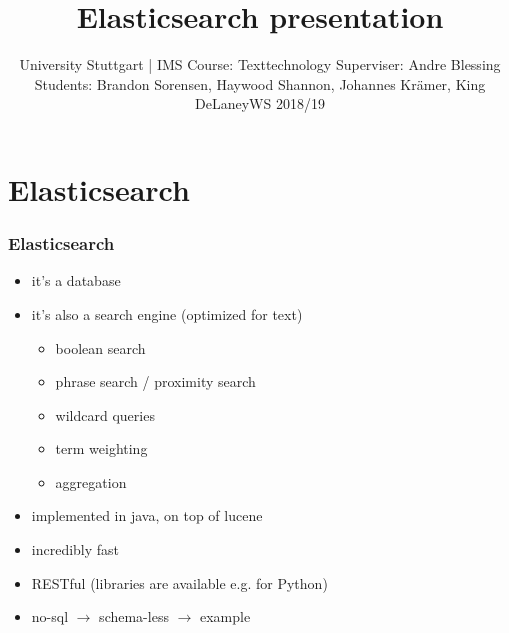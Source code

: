 \documentclass{beamer}
\title{Elasticsearch presentation}
\author{University Stuttgart | IMS \newline Course: Texttechnology \newline Superviser: Andre Blessing \newline Students: Brandon Sorensen, Haywood Shannon, \newline Johannes Krämer, King DeLaney\newline WS 2018/19}
\date{}
\begin{document}
\begin{frame}
\maketitle
\end{frame}

\section{Elasticsearch}
\begin{frame}
\frametitle{Elasticsearch}
\begin{itemize}
\item it's a database
\pause
\item it's also a search engine (optimized for text)
\pause
\begin{itemize}
\item boolean search
\item phrase search / proximity search
\item wildcard queries
\item term weighting
\item aggregation
\end{itemize}
\pause
\item implemented in java, on top of lucene
\item incredibly fast
\item RESTful (libraries are available e.g. for Python)
\item no-sql $\rightarrow$ schema-less $\rightarrow$ example
\end{itemize}
\end{frame}
\end{document}
